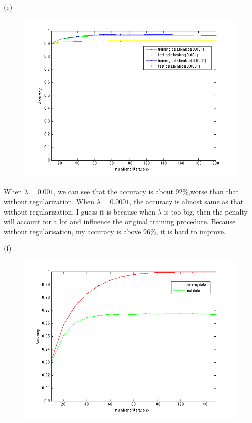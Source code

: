 \documentclass{article} %
\begin{document}
(e) \\
\begin{figure}[htbp] %
   \centering
   \includegraphics[width=5in]{img/p5.png} 
\end{figure}

When $\lambda = 0.001$, we can see that the accuracy is about 92\%,worse than that without regularization. When $\lambda = 0.0001$, the accuracy is almost same as that without regularization. I guess it is because when $\lambda$ is too big, then the penalty will account for a lot and influence the original training procedure. Because without regularisation, my accuracy is above 96\%, it is hard to improve.

(f) \\
\begin{figure}[htbp] %
   \centering
   \includegraphics[width=5in]{img/p6.png} 
\end{figure}
\end{document}
